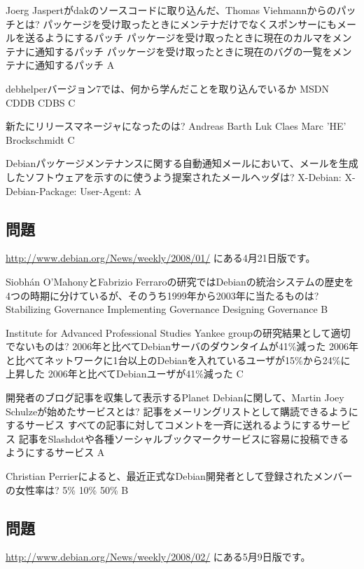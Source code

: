 \documentclass[mingoth,a4paper]{jsarticle}
\begin{document}
\begin{multicols}{2}
 \santaku
 {Joerg Jaspertがdakのソースコードに取り込んだ、Thomas Viehmannからのパッチとは?}
 {パッケージを受け取ったときにメンテナだけでなくスポンサーにもメールを送るようにするパッチ}
 {パッケージを受け取ったときに現在のカルマをメンテナに通知するパッチ}
 {パッケージを受け取ったときに現在のバグの一覧をメンテナに通知するパッチ}
 {A}
 
 \santaku
 {debhelperバージョン7では、何から学んだことを取り込んでいるか}
 {MSDN}
 {CDDB}
 {CDBS}
 {C}
 
 \santaku
 {新たにリリースマネージャになったのは?}
 {Andreas Barth}
 {Luk Claes}
 {Marc 'HE' Brockschmidt}
 {C}
 
 \santaku
 {Debianパッケージメンテナンスに関する自動通知メールにおいて、メールを生成したソフトウェアを示すのに使うよう提案されたメールヘッダは?}
 {X-Debian:}
 {X-Debian-Package:}
 {User-Agent:}
 {A}
 
 \subsection{問題}
 \url{http://www.debian.org/News/weekly/2008/01/}
 にある4月21日版です。
 
 \santaku
 {Siobh\'an O'MahonyとFabrizio Ferraroの研究ではDebianの統治システムの歴史を4つの時期に分けているが、そのうち1999年から2003年に当たるものは?}
 {Stabilizing Governance}%
 {Implementing Governance}%
 {Designing Governance}%
 {B}
 
 \santaku
 {Institute for Advanced Professional Studies Yankee groupの研究結果として適切でないものは?}
 {2006年と比べてDebianサーバのダウンタイムが41\%{}減った}
 {2006年と比べてネットワークに1台以上のDebianを入れているユーザが15\%{}から24\%{}に上昇した}
 {2006年と比べてDebianユーザが41\%{}減った}
 {C}
 
 \santaku
 {開発者のブログ記事を収集して表示するPlanet Debianに関して、Martin Joey Schulzeが始めたサービスとは?}
 {記事をメーリングリストとして購読できるようにするサービス}
 {すべての記事に対してコメントを一斉に送れるようにするサービス}
 {記事をSlashdotや各種ソーシャルブックマークサービスに容易に投稿できるようにするサービス}
 {A}
 
 \santaku
 {Christian Perrierによると、最近正式なDebian開発者として登録されたメンバーの女性率は?}
 {5\%{}}
 {10\%{}}
 {50\%{}}
 {B}
 
 \subsection{問題}
 \url{http://www.debian.org/News/weekly/2008/02/}
 にある5月9日版です。
 

\end{multicols}
\end{document}
